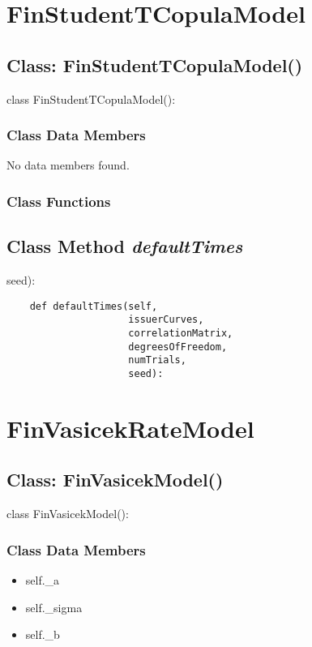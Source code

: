 \documentclass[twoside,11pt]{book}
\begin{document}
\newpage
\section{FinStudentTCopulaModel}

\subsection{Class: FinStudentTCopulaModel()}
class FinStudentTCopulaModel():

\subsubsection{Class Data Members}
No data members found.

\subsubsection{Class Functions}

\subsection{Class Method {\it defaultTimes}}
seed):

\begin{lstlisting}
    def defaultTimes(self, 
                     issuerCurves, 
                     correlationMatrix, 
                     degreesOfFreedom,
                     numTrials, 
                     seed):
\end{lstlisting}

\newpage
\section{FinVasicekRateModel}

\subsection{Class: FinVasicekModel()}
class FinVasicekModel():

\subsubsection{Class Data Members}
\begin{itemize}
\item{self.\_a}
\item{self.\_sigma}
\item{self.\_b}
\end{itemize}
\end{document}
